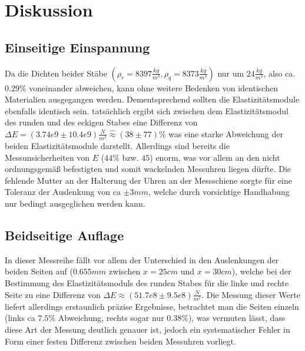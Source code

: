 \section{Diskussion}
\label{sec:Diskussion}

\subsection{Einseitige Einspannung}
Da die Dichten beider Stäbe $\left(\rho_r =8397 \frac{kg}{m^3}, \rho_q = 8373 \frac{kg}{m^3}\right)$ nur um $24 \frac{kg}{m^3}$, also ca. $0.29 \%$ voneinander abweichen, kann ohne weitere Bedenken von identischen Materialien ausgegangen werden. Dementsprechend sollten die Elastizitätsmodule ebenfalls identisch sein. tatsächlich ergibt sich zwischen dem Elastizitätsmodul des runden und des eckigen Stabes eine Differenz von $\Delta E = \left(3.74e9 \pm 10.4e9 \right) \frac{N}{m^2} \hat{\approx} (38 \pm 77) \% $ was eine starke Abweichung der beiden Elastizitätsmodule darstellt. Allerdings sind bereits die Messunsicherheiten von $E$ ($44 \%$ bzw. $45$) enorm, was vor allem an den nicht ordnungsgemäß befestigten und somit wackelnden Messuhren liegen dürfte. Die fehlende Mutter an der Halterung der Uhren an der Messschiene sorgte für eine Toleranz der Auslenkung von ca $\pm 3mm$, welche durch vorsichtige Handhabung nur bedingt ausgeglichen werden kann.

\subsection{Beidseitige Auflage}

In dieser Messreihe fällt vor allem der Unterschied in den Auslenkungen der beiden Seiten auf ($0.655mm$ zwischen $x=25cm$ und $x = 30cm$), welche bei der Bestimmung des Elastizitätsmoduls des runden Stabes für die linke und rechte Seite zu eine Differenz von $\Delta E \approx \left(51.7e8 \pm 9.5e8\right) \frac{N}{m^2}$. Die Messung dieser Werte liefert allerdings erstaunlich präzise Ergebnisse, betrachtet man die Seiten einzeln (links ca $7.5 \%$ Abweichung, rechts sogar nur $0.38 \%$), was vermuten lässt, dass diese Art der Messung deutlich genauer ist, jedoch ein systematischer Fehler in Form einer festen Differenz zwischen beiden Messuhren vorliegt.
